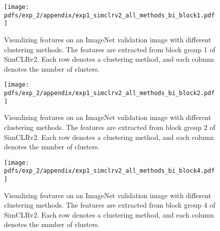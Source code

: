         \begin{figure}[H]
            \centering
            \texttt{[image: pdfs/exp\_2/appendix/exp1\_simclrv2\_all\_methods\_bi\_block1.pdf]}
            \caption{Visualizing features on an ImageNet validation image with different clustering methods. The features are  extracted from block group 1 of SimCLRv2. Each row denotes a clustering method, and each column denotes the number of clusters.}
            \label{fig:exp3.2_all_methods_simclr_v2_bi_block1}
        \end{figure}


        \begin{figure}[H]
            \centering
            \texttt{[image: pdfs/exp\_2/appendix/exp1\_simclrv2\_all\_methods\_bi\_block2.pdf]}
            \caption{Visualizing features on an ImageNet validation image with different clustering methods. The features are  extracted from block group 2 of SimCLRv2. Each row denotes a clustering method, and each column denotes the number of clusters.}
            \label{fig:exp3.2_all_methods_simclr_v2_bi_block2}
        \end{figure}

        
    
        \begin{figure}[H]
            \centering
            \texttt{[image: pdfs/exp\_2/appendix/exp1\_simclrv2\_all\_methods\_bi\_block4.pdf]}
            \caption{Visualizing features on an ImageNet validation image with different clustering methods. The features are  extracted from block group 4 of SimCLRv2. Each row denotes a clustering method, and each column denotes the number of clusters.}
            \label{fig:exp3.2_all_methods_simclr_v2_bi_block4}
        \end{figure}

